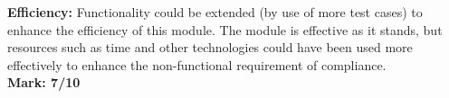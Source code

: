         \item \textbf{Efficiency:}
				Functionality could be extended (by use of more test cases) to enhance
				the efficiency of this module.
				The module is effective as it stands, but resources such as time and
				other technologies could have been used more effectively to enhance the
				non-functional requirement of compliance.\\
				\textbf{Mark: 7/10}